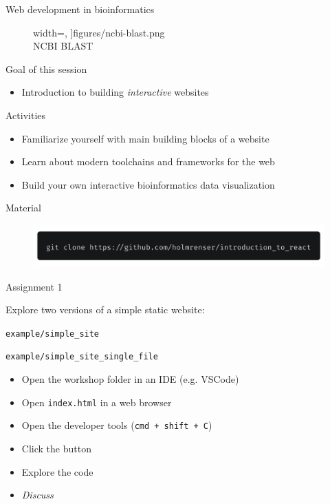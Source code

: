 \documentclass[10pt]{beamer}
\begin{document}
\begin{frame}{Web development in bioinformatics}
\begin{figure}
\begin{minipage}{.3\linewidth}
                width=\linewidth,
            ]{figures/ncbi-blast.png}
            \\ \tiny{NCBI BLAST}
        \end{minipage}
    \end{figure}
\end{frame}

\begin{frame}

    {\huge Goal of this session}
    \begin{itemize}
        \item Introduction to building \textit{interactive} websites
    \end{itemize}
    \vspace{2em}
    {\large Activities}
    \begin{itemize}
        \item Familiarize yourself with main building blocks of a website
        \item Learn about modern toolchains and frameworks for the web
        \item Build your own interactive bioinformatics data visualization
    \end{itemize}
    \vspace{1em}
    {\large Material}
    \begin{figure}
        \includegraphics[width=.99\linewidth]{figures/material-link.png}
    \end{figure}
\end{frame}

\begin{frame}

    {\huge Assignment 1}

    \vspace{1em}
    Explore two versions of a simple static website:

    \vspace{.5em}

    \texttt{example/simple\_site}

    \texttt{example/simple\_site\_single\_file}


    \vspace{2em}
    \begin{itemize}
        \item Open the workshop folder in an IDE (e.g. VSCode)
        \item Open \texttt{index.html} in a web browser
        \item Open the developer tools (\texttt{cmd + shift + C})
        \item Click the button
        \item Explore the code
        \item \textit{Discuss}
    \end{itemize}
\end{frame}
\end{document}
